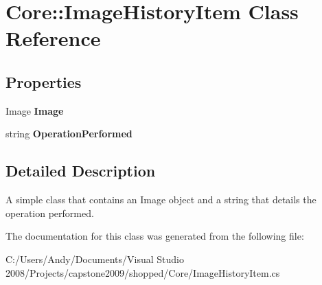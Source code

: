 \hypertarget{class_core_1_1_image_history_item}{
\section{Core::ImageHistoryItem Class Reference}
\label{class_core_1_1_image_history_item}
}
\subsection*{Properties}
\begin{DoxyCompactItemize}
\item 
\hypertarget{class_core_1_1_image_history_item_af5221965c5ea168e8ce2b248783daa23}{
Image {\bfseries Image}}
\label{class_core_1_1_image_history_item_af5221965c5ea168e8ce2b248783daa23}

\item 
\hypertarget{class_core_1_1_image_history_item_aa0775d357dd30dafbc2de674b9bcba2b}{
string {\bfseries OperationPerformed}}
\label{class_core_1_1_image_history_item_aa0775d357dd30dafbc2de674b9bcba2b}

\end{DoxyCompactItemize}


\subsection{Detailed Description}
A simple class that contains an Image object and a string that details the operation performed. 

The documentation for this class was generated from the following file:\begin{DoxyCompactItemize}
\item 
C:/Users/Andy/Documents/Visual Studio 2008/Projects/capstone2009/shopped/Core/ImageHistoryItem.cs\end{DoxyCompactItemize}

